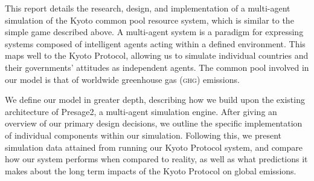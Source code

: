 This report details the research, design, and implementation of a multi-agent simulation of the Kyoto common pool resource system, which is similar to the simple game described above. A multi-agent system is a paradigm for expressing systems composed of intelligent agents acting within a defined environment. This maps well to the Kyoto Protocol, allowing us to simulate individual countries and their governments' attitudes as independent agents. The common pool involved in our model is that of worldwide greenhouse gas (\textsc{ghg}) emissions.

We define our model in greater depth, describing how we build upon the existing architecture of Presage2, a multi-agent simulation engine. After giving an overview of our primary design decisions, we outline the specific implementation of individual components within our simulation. Following this, we present simulation data attained from running our Kyoto Protocol system, and compare how our system performs when compared to reality, as well as what predictions it makes about the long term impacts of the Kyoto Protocol on global emissions.

